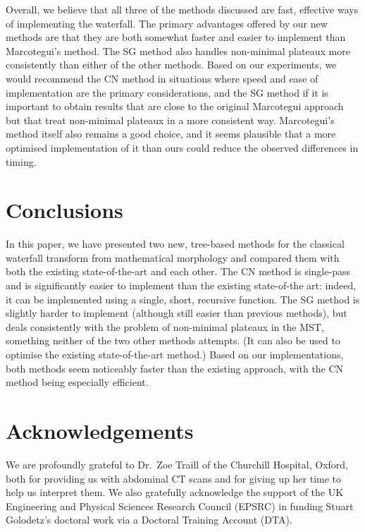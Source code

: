\documentclass[preprint,a4paper]{elsarticle}
\begin{document}
Overall, we believe that all three of the methods discussed are fast, effective ways of implementing the waterfall. The primary advantages offered by our new methods are that they are both somewhat faster and easier to implement than Marcotegui's method. The SG method also handles non-minimal plateaux more consistently than either of the other methods. Based on our experiments, we would recommend the CN method in situations where speed and ease of implementation are the primary considerations, and the SG method if it is important to obtain results that are close to the original Marcotegui approach but that treat non-minimal plateaux in a more consistent way. Marcotegui's method itself also remains a good choice, and it seems plausible that a more optimised implementation of it than ours could reduce the observed differences in timing.

\section{Conclusions}
\label{sec:conclusions}

In this paper, we have presented two new, tree-based methods for the classical waterfall transform from mathematical morphology and compared them with both the existing state-of-the-art and each other. The CN method is single-pass and is significantly easier to implement than the existing state-of-the art: indeed, it can be implemented using a single, short, recursive function. The SG method is slightly harder to implement (although still easier than previous methods), but deals consistently with the problem of non-minimal plateaux in the MST, something neither of the two other methods attempts. (It can also be used to optimise the existing state-of-the-art method.) Based on our implementations, both methods seem noticeably faster than the existing approach, with the CN method being especially efficient.

\section{Acknowledgements}
\label{sec:acknowledgements}

We are profoundly grateful to Dr.\ Zoe Traill of the Churchill Hospital, Oxford, both for providing us with abdominal CT scans and for giving up her time to help us interpret them. We also gratefully acknowledge the support of the UK Engineering and Physical Sciences Research Council (EPSRC) in funding Stuart Golodetz's doctoral work via a Doctoral Training Account (DTA).



\end{document}

